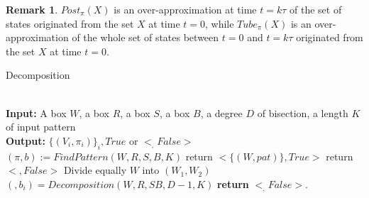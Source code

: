     \textbf{Remark 1}. $Post_{\pi}(X)$ is an over-approximation at time 
    $ t=k\tau $ of the set of states originated from the set $X$ 
    at time $t=0$, while $Tube_{\pi}(X)$ is an over-approximation
    of the whole set of states between $t=0$ and $t=k\tau$ originated
    from the set $X$ at time $t=0$.

    \begin{algorithm}    
        \caption{Decomposition}\label{decomposition}    
        \begin{algorithmic}[1]
           \\
            \textbf{Input:} A box $W$, a box $R$, 
            a box $S$, a box $B$, a degree $D$ of bisection, a length $K$ of input pattern\\
            \textbf{Output:} $ \lbrace(V_i,\pi_i)\rbrace_i, True $ or $ <_,False>$ \\          
            $(\pi,b) := FindPattern(W,R,S,B,K)$
              \State return $<\lbrace (W,pat) \rbrace,True>$
            \Else
                \State return $<,False>$
              \Else
                \State Divide equally $W$ into $(W_1,W_2)$
                  \State $(,b_i) = Decomposition(W,R,SB,D-1,K)$
                \EndFor
              \EndIf
            \EndIf
            \State \textbf{return} $<_,False>$.
          \EndProcedure    
        \end{algorithmic}
      \end{algorithm}


